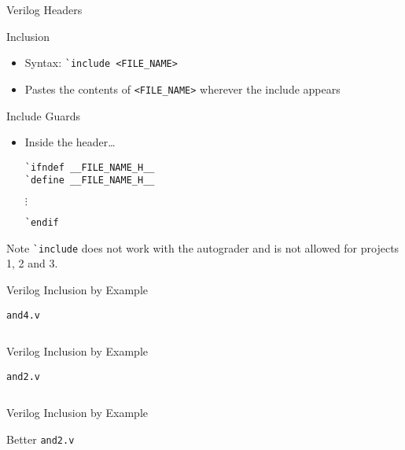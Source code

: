 \documentclass[dvipsnames]{beamer}
\begin{document}
\begin{frame}[fragile]{Verilog Headers}
	\begin{block}{Inclusion}
		\begin{itemize}
			\item Syntax: \texttt{\`{}include <FILE\_NAME>}
			\item Pastes the contents of \texttt{<FILE\_NAME>} wherever the include appears
		\end{itemize}
	\end{block}
	\begin{block}{Include Guards}
		\begin{itemize}
			\item Inside the header\dots
				\begin{verbatim}
`ifndef __FILE_NAME_H__
`define __FILE_NAME_H__
				\end{verbatim}
				$ \mathtt{\vdots} $ 
				\begin{verbatim}
`endif
				\end{verbatim}
		\end{itemize}
	\end{block}
	\begin{block}{Note}
		\texttt{\`{}include} does not work with the autograder and is not
		allowed for projects 1, 2 and 3.
	\end{block}
\end{frame}

\begin{frame}{Verilog Inclusion by Example}
	\begin{block}{\texttt{and4.v}}
		\inputminted[frame=lines,obeytabs,tabsize=4,fontsize=\scriptsize]{verilog}{verilog/and4.v}
	\end{block}
\end{frame}

\begin{frame}{Verilog Inclusion by Example}
	\begin{block}{\texttt{and2.v}}
		\inputminted[frame=lines,obeytabs,tabsize=4,fontsize=\scriptsize,firstline=3,lastline=9]{verilog}{verilog/and2.v}
	\end{block}
\end{frame}

\begin{frame}{Verilog Inclusion by Example}
	\begin{block}{Better \texttt{and2.v}}
		\inputminted[frame=lines,obeytabs,tabsize=4,fontsize=\scriptsize]{verilog}{verilog/and2.v}
	\end{block}
\end{frame}
\end{document}

